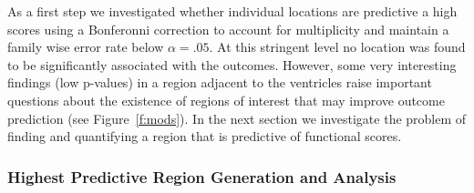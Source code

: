 \documentclass[10pt]{article}\usepackage[]{graphicx}\usepackage[]{color}
\begin{document}
As a first step we investigated whether individual locations are predictive a high scores using a Bonferonni correction to account for multiplicity and maintain a family wise error rate below $\alpha=.05$. At this stringent level no location was  found to be significantly associated with the outcomes. However, some very interesting findings (low p-values) in a region adjacent to the ventricles raise important questions about the existence of regions of interest that may improve outcome prediction (see Figure~\ref{f:mods}).  In the next section we investigate the  problem of finding and quantifying a region that is predictive of functional scores.


\subsubsection{Highest Predictive Region Generation and Analysis}
\end{document}
